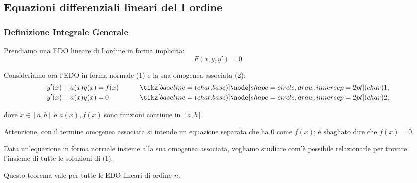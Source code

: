 \subsection{Equazioni differenziali lineari del I ordine}

\subsubsection{Definizione Integrale Generale}

Prendiamo una EDO lineare di I ordine in forma implicita:
\[
    F(x, y, y') = 0
\]

Consideriamo ora l'EDO in forma normale (1) e la sua omogenea associata (2):
\begin{align*}
    y'(x)+a(x)y(x) & = f(x) & \qquad \circled{1} \\
    y'(x)+a(x)y(x) & = 0    & \qquad \circled{2}
\end{align*}

dove \(x \in [a,b]\) e \(a(x), f(x)\) sono funzioni continue in \([a,b]\).

\underline{Attenzione}, con il termine omogenea associata si intende un equazione separata che ha \(0\) come \(f(x)\); è sbagliato dire che \(f(x) = 0\).

Data un'equazione in forma normale insieme alla sua omogenea associata, vogliamo studiare com'è possibile relazionarle per trovare l'insieme di tutte le soluzioni di (1).


Questo teorema vale per tutte le EDO lineari di ordine \(n\).

